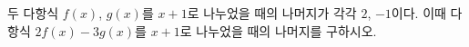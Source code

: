두 다항식 $f(x)$, $g(x)$를 $x+1$로 나누었을 때의 나머지가 각각 $2$, $-1$이다. 이때 다항식 $2f(x)-3g(x)$를 $x+1$로 나누었을 때의 나머지를 구하시오.
